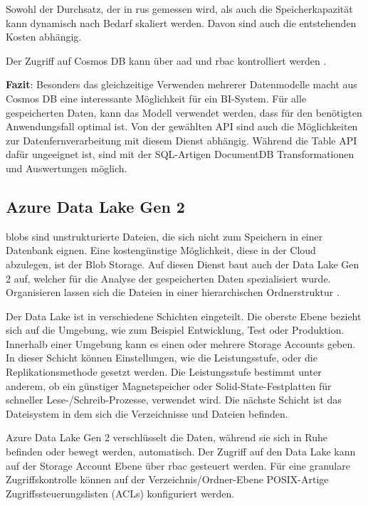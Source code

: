 Sowohl der Durchsatz, der in \acp{ru} gemessen wird, als auch die Speicherkapazität kann dynamisch nach Bedarf skaliert werden. Davon sind auch die entstehenden Kosten abhängig.
\cite{guay_paz_microsoft_2018}\cite{mrzyglod_hands-azure_2018}

Der Zugriff auf Cosmos DB kann über \ac{aad} und \ac{rbac} kontrolliert werden \cite{weiss_azure_2021}.

\textbf{Fazit}: Besonders das gleichzeitige Verwenden mehrerer Datenmodelle macht aus Cosmos DB eine interessante Möglichkeit für ein BI-System. Für alle gespeicherten Daten, kann das Modell verwendet werden, dass für den benötigten Anwendungsfall optimal ist. Von der gewählten API sind auch die Möglichkeiten zur Datenfernverarbeitung mit diesem Dienst abhängig. Während die Table API dafür ungeeignet ist, sind mit der SQL-Artigen DocumentDB Transformationen und Auswertungen möglich.

\subsection{Azure Data Lake Gen 2} \label{sec:grundlagen:azure_dienste:dataLake}
\acp{blob} sind unstrukturierte Dateien, die sich nicht zum Speichern in einer Datenbank eignen. Eine kostengünstige Möglichkeit, diese in der Cloud abzulegen, ist der Blob Storage. Auf diesen Dienst baut auch der Data Lake Gen 2 auf, welcher für die Analyse der gespeicherten Daten spezialisiert wurde. Organisieren lassen sich die Dateien in einer hierarchischen Ordnerstruktur \cite{soh_microsoft_2020}.

Der Data Lake ist in verschiedene Schichten eingeteilt. Die oberste Ebene bezieht sich auf die Umgebung, wie zum Beispiel Entwicklung, Test oder Produktion. Innerhalb einer Umgebung kann es einen oder mehrere Storage Accounts geben. In dieser Schicht können Einstellungen, wie die Leistungsstufe, oder die Replikationsmethode gesetzt werden. Die Leistungsstufe bestimmt unter anderem, ob ein günstiger Magnetspeicher oder Solid-State-Festplatten für schneller Lese-/Schreib-Prozesse, verwendet wird. Die nächste Schicht ist das Dateisystem in dem sich die Verzeichnisse und Dateien befinden.

Azure Data Lake Gen 2 verschlüsselt die Daten, während sie sich in Ruhe befinden oder bewegt werden, automatisch. Der Zugriff auf den Data Lake kann auf der Storage Account Ebene über \ac{rbac} gesteuert werden. Für eine granulare Zugriffskontrolle können auf der Verzeichnis/Ordner-Ebene POSIX-Artige Zugriffssteuerungslisten (ACLs) konfiguriert werden.

